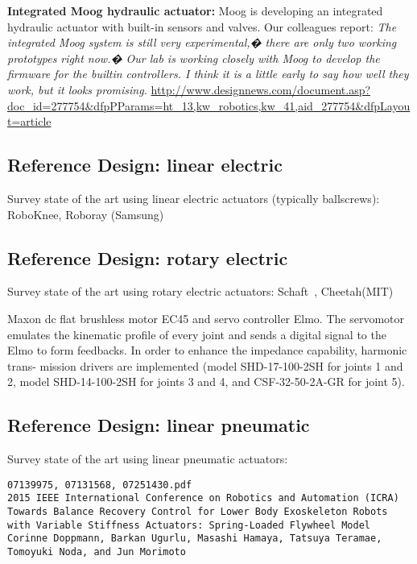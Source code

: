 \documentclass[letterpaper,12pt,fullpage]{article}
\begin{document}
{\bf Integrated Moog hydraulic actuator:}
Moog is developing an integrated hydraulic actuator with built-in
sensors and valves. Our colleagues report:
{\it The integrated Moog system is still very experimental,� there are
only two working prototypes right now.� Our lab is working closely
with Moog to develop the firmware for the builtin controllers. I
think it is a little early to say how well they work, but it looks
promising.}
\url{http://www.designnews.com/document.asp?doc_id=277754&dfpPParams=ht_13,kw_robotics,kw_41,aid_277754&dfpLayout=article}

\subsection{Reference Design: linear electric}

Survey state of the art using linear electric actuators (typically ballscrews):
RoboKnee, Roboray (Samsung)

\subsection{Reference Design: rotary electric}

Survey state of the art using rotary electric actuators:
Schaft~\cite{shaft_foot_placement,shaft_push_recov}, Cheetah(MIT)

Maxon dc flat brushless motor EC45 and servo controller
Elmo. The servomotor emulates the kinematic profile of every
joint and sends a digital signal to the Elmo to form feedbacks.
In order to enhance the impedance capability, harmonic trans-
mission drivers are implemented (model SHD-17-100-2SH
for joints 1 and 2, model SHD-14-100-2SH for joints 3 and 4,
and CSF-32-50-2A-GR for joint 5).~\cite{IEEE07128705}

\subsection{Reference Design: linear pneumatic}

Survey state of the art using linear pneumatic actuators:

\begin{verbatim}
07139975, 07131568, 07251430.pdf
2015 IEEE International Conference on Robotics and Automation (ICRA)
Towards Balance Recovery Control for Lower Body Exoskeleton Robots
with Variable Stiffness Actuators: Spring-Loaded Flywheel Model
Corinne Doppmann, Barkan Ugurlu, Masashi Hamaya, Tatsuya Teramae,
Tomoyuki Noda, and Jun Morimoto
\end{verbatim}
\end{document}
